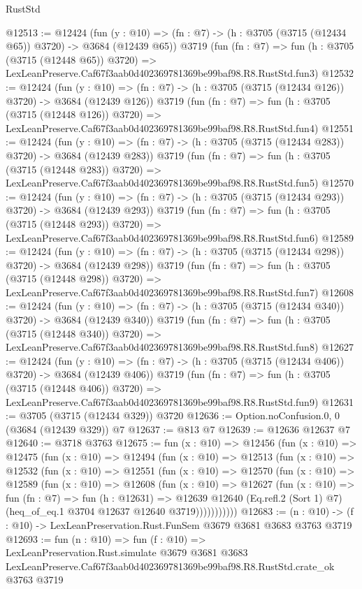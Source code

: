 \begin{lexlean}{RustStd}
\begin{coremodule}
@12513 := @12424
    (fun (y : @10) => (fn : @7) -> (h : @3705 (@3715 (@12434 @65)) @3720) -> @3684 (@12439 @65))
    @3719
    (fun (fn : @7) =>
    fun (h : @3705 (@3715 (@12448 @65)) @3720) =>
    LexLeanPreserve.Caf67f3aab0d402369781369be99baf98.R8.RustStd.fun3)
@12532 := @12424
    (fun (y : @10) => (fn : @7) -> (h : @3705 (@3715 (@12434 @126)) @3720) -> @3684 (@12439 @126))
    @3719
    (fun (fn : @7) =>
    fun (h : @3705 (@3715 (@12448 @126)) @3720) =>
    LexLeanPreserve.Caf67f3aab0d402369781369be99baf98.R8.RustStd.fun4)
@12551 := @12424
    (fun (y : @10) => (fn : @7) -> (h : @3705 (@3715 (@12434 @283)) @3720) -> @3684 (@12439 @283))
    @3719
    (fun (fn : @7) =>
    fun (h : @3705 (@3715 (@12448 @283)) @3720) =>
    LexLeanPreserve.Caf67f3aab0d402369781369be99baf98.R8.RustStd.fun5)
@12570 := @12424
    (fun (y : @10) => (fn : @7) -> (h : @3705 (@3715 (@12434 @293)) @3720) -> @3684 (@12439 @293))
    @3719
    (fun (fn : @7) =>
    fun (h : @3705 (@3715 (@12448 @293)) @3720) =>
    LexLeanPreserve.Caf67f3aab0d402369781369be99baf98.R8.RustStd.fun6)
@12589 := @12424
    (fun (y : @10) => (fn : @7) -> (h : @3705 (@3715 (@12434 @298)) @3720) -> @3684 (@12439 @298))
    @3719
    (fun (fn : @7) =>
    fun (h : @3705 (@3715 (@12448 @298)) @3720) =>
    LexLeanPreserve.Caf67f3aab0d402369781369be99baf98.R8.RustStd.fun7)
@12608 := @12424
    (fun (y : @10) => (fn : @7) -> (h : @3705 (@3715 (@12434 @340)) @3720) -> @3684 (@12439 @340))
    @3719
    (fun (fn : @7) =>
    fun (h : @3705 (@3715 (@12448 @340)) @3720) =>
    LexLeanPreserve.Caf67f3aab0d402369781369be99baf98.R8.RustStd.fun8)
@12627 := @12424
    (fun (y : @10) => (fn : @7) -> (h : @3705 (@3715 (@12434 @406)) @3720) -> @3684 (@12439 @406))
    @3719
    (fun (fn : @7) =>
    fun (h : @3705 (@3715 (@12448 @406)) @3720) =>
    LexLeanPreserve.Caf67f3aab0d402369781369be99baf98.R8.RustStd.fun9)
@12631 := @3705 (@3715 (@12434 @329)) @3720
@12636 := Option.noConfusion.{0, 0} (@3684 (@12439 @329)) @7
@12637 := @813 @7
@12639 := @12636 @12637 @7
@12640 := @3718 @3763
@12675 := fun (x : @10) =>
  @12456
    (fun (x : @10) =>
    @12475
      (fun (x : @10) =>
      @12494
        (fun (x : @10) =>
        @12513
          (fun (x : @10) =>
          @12532
            (fun (x : @10) =>
            @12551
              (fun (x : @10) =>
              @12570
                (fun (x : @10) =>
                @12589
                  (fun (x : @10) =>
                  @12608
                    (fun (x : @10) =>
                    @12627
                      (fun (x : @10) =>
                      fun (fn : @7) =>
                      fun (h : @12631) =>
                      @12639
                        @12640
                        (Eq.refl.{2} (Sort 1) @7)
                        (heq_of_eq.{1} @3704 @12637 @12640 @3719)))))))))))
@12683 := (n : @10) -> (f : @10) -> LexLeanPreservation.Rust.FunSem @3679 @3681 @3683 @3763 @3719
@12693 := fun (n : @10) =>
  fun (f : @10) =>
  LexLeanPreservation.Rust.simulate
    @3679
    @3681
    @3683
    LexLeanPreserve.Caf67f3aab0d402369781369be99baf98.R8.RustStd.crate_ok
    @3763
    @3719
\end{coremodule}
\end{lexlean}
